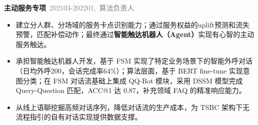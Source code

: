 \documentclass{resume}
\newenvironment{graybox}{%
  \begin{mdframed}[backgroundcolor=lightgray,linewidth=0pt,innerleftmargin=8pt,innerrightmargin=8pt,innertopmargin=6pt,innerbottommargin=6pt]
}{%
  \end{mdframed}
}
\begin{document}
\begin{graybox}
\vspace{0.3em}
\textbf{主动服务专项}\ {\small\textcolor{gray}{\hfill 202103-202201,\ 算法负责人}}
\begin{onehalfspacing}
\begin{itemize}
  \item 建立分人群、分场域的服务卡点识别能力；通过服务权益的uplift预测和流失预警，匹配补偿动作；最终通过\textbf{智能触达机器人（Agent）}实现有心智的主动服务触达。
  \item 承担智能触达机器人开发，基于 FSM 实现了特定业务场景下的智能外呼对话（日均外呼200，会话完成率64\%）；算法层面，基于 BERT fine-tune 实现意图分类；在 FSM 对话流基础上集成 QQ-Bot 模块，采用 DSSM 模型完成 Query-Question 匹配，ACC@1 达 0.87，补充领域 FAQ 的精准响应能力。
  \item 从线上语聊挖掘高频对话序列，降低对话流的生产成本，为 TSBC 架构下无流程指引的自有对话实现提供数据支撑。
\end{itemize}
\end{onehalfspacing}
\end{graybox}

\vspace{0.5em}
\end{document}
